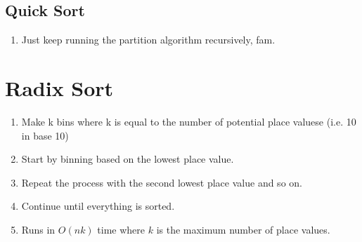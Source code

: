 \documentclass[a4paper,12pt]{report}
\begin{document}
\subsection{Quick Sort}
\begin{enumerate}
\item Just keep running the partition algorithm recursively, fam.
\end{enumerate}

\section{Radix Sort}
\begin{enumerate}
\item Make k bins where k is equal to the number of potential place valuese (i.e. 10 in base 10)
\item Start by binning based on the lowest place value.
\item Repeat the process with the second lowest place value and so on.
\item Continue until everything is sorted.
\item Runs in $O(nk)$ time where $k$ is the maximum number of place values. 
\end{enumerate}
\end{document}
